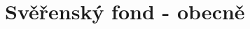 \documentclass{article}
\begin{document}





\newpage

\section{Svěřenský fond - obecně}
\end{document}
